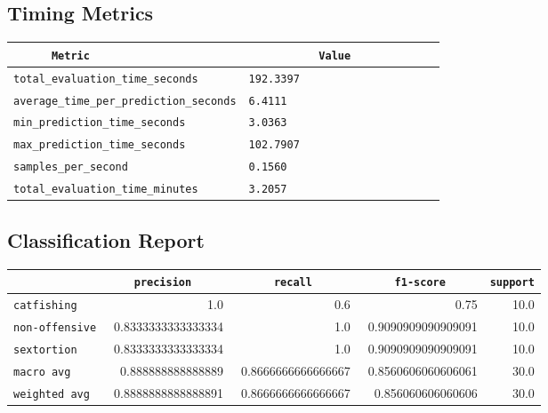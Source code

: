 \documentclass{article}
\begin{document}
\subsection{Timing Metrics}

\begin{center}
\begin{tabular}{l | l} \hline
    \verb|      Metric     | & \verb|           Value           | \\ \hline
    \hline
    \verb|total_evaluation_time_seconds| & \verb|192.3397                     | \\ \hline
    \verb|average_time_per_prediction_seconds| & \verb|6.4111                       | \\ \hline
    \verb|min_prediction_time_seconds| & \verb|3.0363                       | \\ \hline
    \verb|max_prediction_time_seconds| & \verb|102.7907                     | \\ \hline
    \verb|samples_per_second| & \verb|0.1560                       | \\ \hline
    \verb|total_evaluation_time_minutes| & \verb|3.2057                       | \\ \hline
\end{tabular}
\end{center}

\subsection{Classification Report}

\begin{center}
\begin{tabular}{l | r | r | r | r} \hline
    \verb|            | & \verb|    precision     | & \verb|      recall      | & \verb|     f1-score     | & \verb|support| \\ \hline
    \hline
    \verb|catfishing | & 1.0 & 0.6 & 0.75 &    10.0 \\ \hline
    \verb|non-offensive| & 0.8333333333333334 & 1.0 & 0.9090909090909091 &    10.0 \\ \hline
    \verb|sextortion | & 0.8333333333333334 & 1.0 & 0.9090909090909091 &    10.0 \\ \hline
    \verb|macro avg  | & 0.888888888888889 & 0.8666666666666667 & 0.8560606060606061 &    30.0 \\ \hline
    \verb|weighted avg| & 0.8888888888888891 & 0.8666666666666667 & 0.856060606060606 &    30.0 \\ \hline
\end{tabular}
\end{center}
\end{document}
